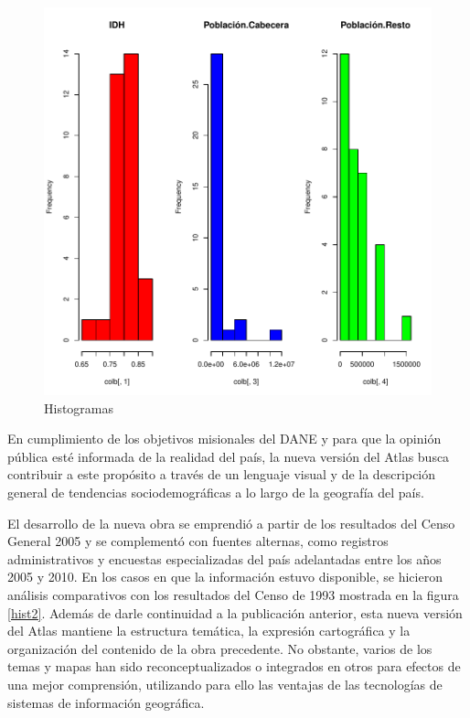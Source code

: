 \documentclass{article}
\begin{document}
\clearpage

\begin{figure}[h]
\centering


\includegraphics{Proyecto_Final-barplots}
\caption{Histogramas}
\label{hist1}
\end{figure}

En cumplimiento de los objetivos misionales del DANE y para que la opinión pública esté informada de la realidad del país, la nueva versión del Atlas busca contribuir a este propósito a través de un lenguaje visual y de la descripción general de tendencias sociodemográficas a lo largo de la geografía del país.

El desarrollo de la nueva obra se emprendió a partir de los resultados del Censo General 2005 y se complementó con fuentes alternas, como registros administrativos y encuestas especializadas del país adelantadas entre los años 2005 y 2010. En los casos en que la información estuvo disponible, se hicieron análisis comparativos con los resultados del Censo de 1993 mostrada en la figura \ref{hist2}.
Además de darle continuidad a la publicación anterior, esta nueva versión del Atlas mantiene la estructura temática, la expresión cartográfica y la organización del contenido de la obra precedente. No obstante, varios de los temas y mapas han sido reconceptualizados o integrados en otros para efectos de una mejor comprensión, utilizando para ello las ventajas de las tecnologías de sistemas de información geográfica.
\clearpage
\end{document}
